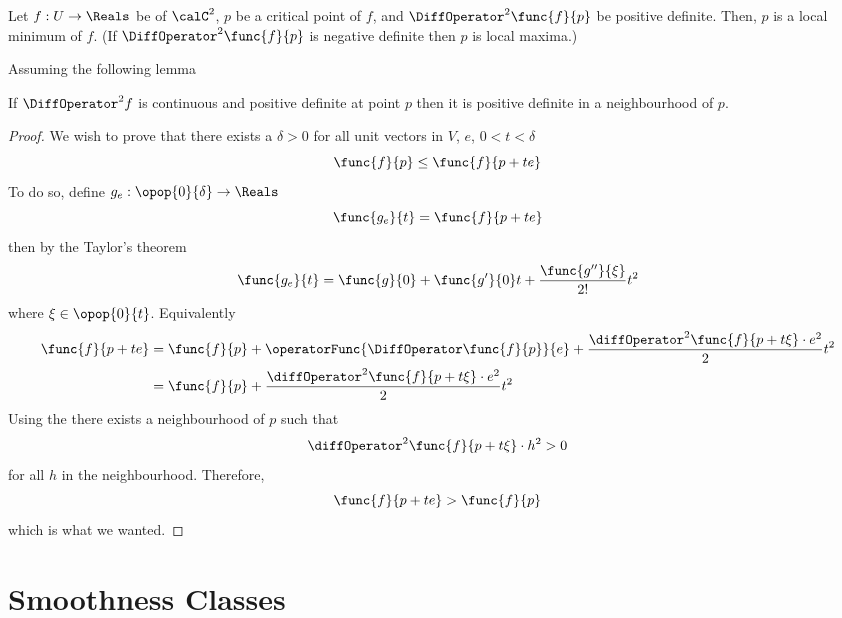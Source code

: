 \begin{theorem}
    Let \(f : U \to \Reals\) be of \(\calC^2\), \(p\) be a critical point of \(f\), and \(\DiffOperator^2 \func{f}{p}\) be positive definite. Then, \(p\) is a local minimum of \(f\). (If \(\DiffOperator^2 \func{f}{p}\) is negative definite then \(p\) is local maxima.)
\end{theorem}
Assuming the following lemma
\begin{lemma} \label{lm:ContinuityOfPositiveDefinite}
    If \(\DiffOperator^2 f\) is continuous and positive definite at point \(p\) then it is positive definite in a neighbourhood of \(p\).
\end{lemma}
\begin{proof}
    We wish to prove that there exists a \(\delta > 0\) for all unit vectors in \(V\), \(e\), \( 0 < t < \delta\)
    \begin{equation*}
        \func{f}{p} \leq \func{f}{p + te}
    \end{equation*}
    To do so, define \(g_e : \opop{0}{\delta} \to \Reals\)
    \begin{equation*}
        \func{g_e}{t} = \func{f}{p + te}
    \end{equation*}
    then by the Taylor's theorem
    \begin{equation*}
        \func{g_e}{t} = \func{g}{0}  + \func{g'}{0}t + \dfrac{\func{g''}{\xi}}{2!}t^2
    \end{equation*}
    where \(\xi \in \opop{0}{t}\). Equivalently
    \begin{align*}
        \func{f}{p + te} & = \func{f}{p} + \operatorFunc{\DiffOperator \func{f}{p}}{e} + \dfrac{\diffOperator^2 \func{f}{p + t\xi} \cdot e^2}{2}t^2 \\
                         & = \func{f}{p} +  \dfrac{\diffOperator^2 \func{f}{p + t\xi} \cdot e^2}{2}t^2
    \end{align*}
    Using the  there exists a neighbourhood of \(p\) such that
    \begin{equation*}
        \diffOperator^2 \func{f}{p + t\xi} \cdot h^2 > 0
    \end{equation*}
    for all \(h\) in the neighbourhood. Therefore,
    \begin{equation*}
        \func{f}{p + te} > \func{f}{p}
    \end{equation*}
    which is what we wanted.
\end{proof}

\section{Smoothness Classes}

